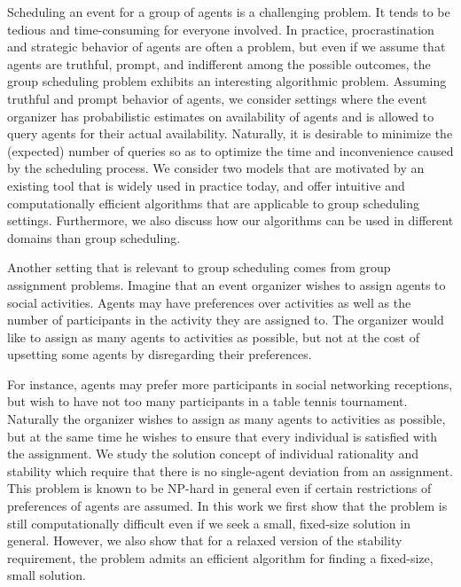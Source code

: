 Scheduling an event for a group of agents is a challenging problem. 
It tends to be tedious and time-consuming for everyone involved. 
In practice, procrastination and strategic behavior of agents are often a problem, but even if we assume that agents are truthful, prompt, and indifferent among the possible outcomes, the group scheduling problem exhibits an interesting algorithmic problem. Assuming truthful and prompt behavior of agents, we consider settings where the event organizer has probabilistic estimates on availability of agents and is allowed to query agents for their actual availability. Naturally, it is desirable to minimize the (expected) number of queries so as to optimize the time and inconvenience caused by the scheduling process. We consider two models that are motivated by an existing tool that is widely used in practice today, and offer intuitive and computationally efficient algorithms that are applicable to group scheduling settings. Furthermore, we also discuss how our algorithms can be used in different domains than group scheduling. 

Another setting that is relevant to group scheduling comes from group assignment problems. Imagine that an event organizer wishes to assign agents to social activities. Agents may have preferences over activities as well as the number of participants in the activity they are assigned to. The organizer would like to assign as many agents to activities as possible, but not at the cost of upsetting some agents by disregarding their preferences. 


For instance, agents may prefer more participants in social networking receptions, but wish to have not too many participants in a table tennis tournament. Naturally the organizer wishes to assign as many agents to activities as possible, but at the same time he wishes to ensure that every individual is satisfied with the assignment. We study the solution concept of individual rationality and stability which require that there is no single-agent deviation from an assignment. This problem is known to be NP-hard in general even if certain restrictions of preferences of agents are assumed. In this work we first show that the problem is still computationally difficult even if we seek a small, fixed-size solution in general. However, we also show that for a relaxed version of the stability requirement, the problem admits an efficient algorithm for finding a fixed-size, small solution. 

